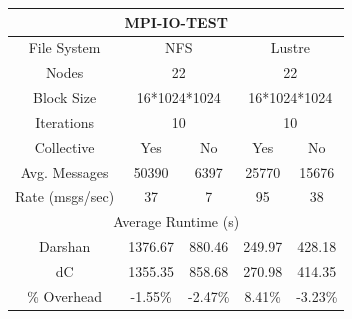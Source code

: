\begin{table}[h]
    \begin{subtable}[h]{0.5\textwidth}
    \vspace{0.5cm}
        \centering
        \setlength\tabcolsep{8pt}
       \begin{tabular}{|ccccc|}
        \hline
        \multicolumn{5}{|c|}{MPI-IO-TEST}                                                                                                              \\ \hline
        \multicolumn{1}{|c|}{File System}        & \multicolumn{2}{c|}{NFS}                                    & \multicolumn{2}{c|}{Lustre}           \\ \hline
        \multicolumn{1}{|c|}{Nodes}              & \multicolumn{2}{c|}{22}                                     & \multicolumn{2}{c|}{22}               \\ \hline
        \multicolumn{1}{|c|}{Block Size}         & \multicolumn{2}{c|}{16*1024*1024}                           & \multicolumn{2}{c|}{16*1024*1024}     \\ \hline
        \multicolumn{1}{|c|}{Iterations}         & \multicolumn{2}{c|}{10}                                     & \multicolumn{2}{c|}{10}               \\ \hline
        \multicolumn{1}{|c|}{Collective}         & \multicolumn{1}{c|}{Yes}     & \multicolumn{1}{c|}{No}      & \multicolumn{1}{c|}{Yes}    & No      \\ \hline
        \multicolumn{1}{|c|}{Avg. Messages}      & \multicolumn{1}{c|}{50390}   & \multicolumn{1}{c|}{6397}    & \multicolumn{1}{c|}{25770}  & 15676   \\ \hline
        \multicolumn{1}{|c|}{Rate (msgs/sec)} & \multicolumn{1}{c|}{37}      & \multicolumn{1}{c|}{7}       & \multicolumn{1}{c|}{95}     & 38      \\ \hline
        \multicolumn{5}{|c|}{Average Runtime (s)}                                                                                                      \\ \hline
        \multicolumn{1}{|c|}{Darshan}            & \multicolumn{1}{c|}{1376.67} & \multicolumn{1}{c|}{880.46}  & \multicolumn{1}{c|}{249.97} & 428.18  \\ \hline
        \multicolumn{1}{|c|}{dC}                 & \multicolumn{1}{c|}{1355.35} & \multicolumn{1}{c|}{858.68}  & \multicolumn{1}{c|}{270.98} & 414.35  \\ \hline
        \multicolumn{1}{|c|}{\% Overhead}        & \multicolumn{1}{c|}{-1.55\%} & \multicolumn{1}{c|}{-2.47\%} & \multicolumn{1}{c|}{8.41\%} & -3.23\% \\ \hline

\end{tabular}
\end{subtable}
\end{table}
